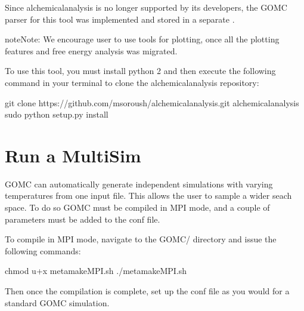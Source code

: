 \documentclass[letterpaper,10pt,english]{sphinxmanual}
\begin{document}
\begin{enumerate}
Since alchemical\sphinxhyphen{}analysis is no longer supported by its developers, the GOMC parser for this tool
was implemented and stored in a separate .

\begin{sphinxadmonition}{note}{Note:}
We encourage user to use  tools for plotting,
once all the plotting features and free energy analysis was migrated.
\end{sphinxadmonition}

To use this tool, you must install python 2 and then execute the following command in
your terminal to clone the alchemical\sphinxhyphen{}analysis repository:

\begin{sphinxVerbatim}[commandchars=\\\{\}]
\PYGZdl{} git  clone    https://github.com/msoroush/alchemical\PYGZhy{}analysis.git
\PYGZdl{}    alchemical\PYGZhy{}analysis
\PYGZdl{} sudo python setup.py install
\end{sphinxVerbatim}

\end{enumerate}


\section{Run a Multi\sphinxhyphen{}Sim}
\label{\detokenize{howto:run-a-multi-sim}}
GOMC can automatically generate independent simulations with varying temperatures from one input file.
This allows the user to sample a wider seach space.  To do so GOMC must be compiled in MPI mode,
and a couple of parameters must be added to the conf file.

To compile in MPI mode, navigate to the GOMC/ directory and issue the following commands:

\begin{sphinxVerbatim}[commandchars=\\\{\}]
\PYGZdl{} chmod u+x metamakeMPI.sh
\PYGZdl{} ./metamakeMPI.sh
\end{sphinxVerbatim}

Then once the compilation is complete, set up the conf file as you would for a standard GOMC simulation.
\end{document}
